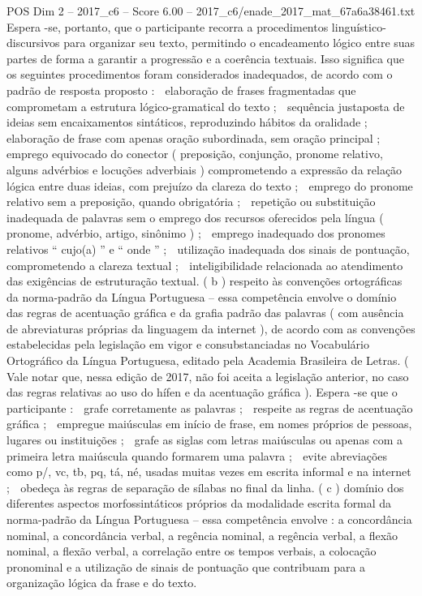 \begin{textsample}{POS Dim 2 – 2017\_c6 – Score 6.00 – 2017\_c6/enade\_2017\_mat\_67a6a38461.txt}
Espera -se, portanto, que o participante recorra a procedimentos linguístico-discursivos para organizar seu texto, permitindo o encadeamento lógico entre suas partes de forma a garantir a progressão e a coerência textuais.
Isso significa que os seguintes procedimentos foram considerados inadequados, de acordo com o padrão de resposta proposto :  elaboração de frases fragmentadas que comprometam a estrutura lógico-gramatical do texto ;  sequência justaposta de ideias sem encaixamentos sintáticos, reproduzindo hábitos da oralidade ;  elaboração de frase com apenas oração subordinada, sem oração principal ;  emprego equivocado do conector ( preposição, conjunção, pronome relativo, alguns advérbios e locuções adverbiais ) comprometendo a expressão da relação lógica entre duas ideias, com prejuízo da clareza do texto ;  emprego do pronome relativo sem a preposição, quando obrigatória ;  repetição ou substituição inadequada de palavras sem o emprego dos recursos oferecidos pela língua ( pronome, advérbio, artigo, sinônimo ) ;  emprego inadequado dos pronomes relativos “ cujo(a) ” e “ onde ” ;  utilização inadequada dos sinais de pontuação, comprometendo a clareza textual ;  inteligibilidade relacionada ao atendimento das exigências de estruturação textual. ( b ) respeito às convenções ortográficas da norma-padrão da Língua Portuguesa – essa competência envolve o domínio das regras de acentuação gráfica e da grafia padrão das palavras ( com ausência de abreviaturas próprias da linguagem da internet ), de acordo com as convenções estabelecidas pela legislação em vigor e consubstanciadas no Vocabulário Ortográfico da Língua Portuguesa, editado pela Academia Brasileira de Letras. ( Vale notar que, nessa edição de 2017, não foi aceita a legislação anterior, no caso das regras relativas ao uso do hífen e da acentuação gráfica ).
Espera -se que o participante :  grafe corretamente as palavras ;  respeite as regras de acentuação gráfica ;  empregue maiúsculas em início de frase, em nomes próprios de pessoas, lugares ou instituições ;  grafe as siglas com letras maiúsculas ou apenas com a primeira letra maiúscula quando formarem uma palavra ;  evite abreviações como p/, vc, tb, pq, tá, né, usadas muitas vezes em escrita informal e na internet ;  obedeça às regras de separação de sílabas no final da linha. ( c ) domínio dos diferentes aspectos morfossintáticos próprios da modalidade escrita formal da norma-padrão da Língua Portuguesa – essa competência envolve : a concordância nominal, a concordância verbal, a regência nominal, a regência verbal, a flexão nominal, a flexão verbal, a correlação entre os tempos verbais, a colocação pronominal e a utilização de sinais de pontuação que contribuam para a organização lógica da frase e do texto.

\end{textsample}
